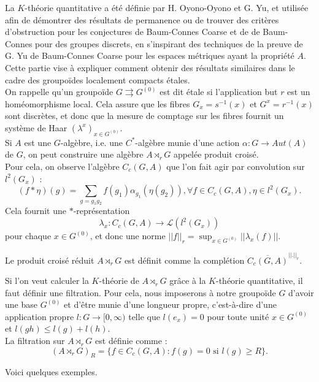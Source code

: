 La $K$-théorie quantitative a été définie par H. Oyono-Oyono et G. Yu, et utilisée afin de démontrer des résultats de permanence ou de trouver des critères d'obstruction pour les conjectures de Baum-Connes Coarse et de de Baum-Connes pour des groupes discrets, en s'inspirant des techniques de la preuve de G. Yu de Baum-Connes Coarse pour les espaces métriques ayant la propriété $A$. Cette partie vise à expliquer comment obtenir des résultats similaires dans le cadre des groupoïdes localement compacts étales.\\

On rappelle qu'un groupoïde $G\rightrightarrows G^{(0)}$ est dit étale si l'application but $r$ est un homéomorphisme local. Cela assure que les fibres $G_x=s^{-1}(x)$ et $G^x=r^{-1}(x)$ sont discrètes, et donc que la mesure de comptage sur les fibres fournit un système de Haar $(\lambda^x)_{x\in G^{(0)}}$.\\

Si $A$ est une $G$-algèbre, i.e. une $C^*$-algèbre munie d'une action $\alpha : G\rightarrow Aut(A)$ de $G$, on peut construire une algèbre $A\rtimes_{r}G$ appelée produit croisé.\\

Pour cela, on observe l'algèbre $C_c(G,A)$ que l'on fait agir par convolution sur $l^2(G_x)$ :
\[(f\ast \eta) (g)=\sum_{g=g_1 g_2} f(g_1)\alpha_{g_1}(\eta(g_2)),\forall f\in C_c(G,A),\eta\in l^2(G_x).\]
Cela fournit une $*$-représentation 
\[\lambda_x : C_c(G,A)\rightarrow  \mathcal L(l^2(G_x))\]
pour chaque $x\in G^{(0)}$, et donc une norme $||f||_r=\sup_{x\in G^{(0)}} ||\lambda_x(f)||$. 
\begin{definition}
Le produit croisé réduit $A\rtimes_r G$ est définit comme la complétion $\overline{C_c(G,A)}^{||.||_r}$.
\end{definition}

Si l'on veut calculer la $K$-théorie de $A\rtimes_r G$ grâce à la $K$-théorie quantitative, il faut définir une filtration. Pour cela, nous imposerons à notre groupoïde $G$ d'avoir une base $G^{(0)}$ et d'être munie d'une longueur propre, c'est-à-dire d'une application propre $l:G\rightarrow [0,\infty)$ telle que $l(e_x)=0$ pour toute unité $x\in G^{(0)}$ et $l(gh)\leq l(g)+l(h)$.\\

La filtration sur $A\rtimes_r G$ est définie comme :
\[(A\rtimes_r G)_R = \{f\in C_c(G,A) : f(g)=0 \text{ si } l(g)\geq R\}.\]

Voici quelques exemples.\\

